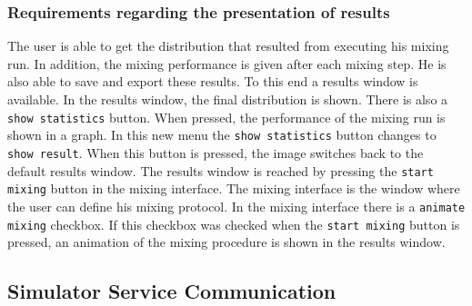 \subsubsection{Requirements regarding the presentation of results}
The user is able to get the distribution that resulted from executing his mixing run. In addition, the mixing performance is given after each mixing step. He is also able to save and export these results. To this end a results window is available. In the results window, the final distribution is shown. There is also a \texttt{show statistics} button. When pressed, the performance of the mixing run is shown in a graph. In this new menu the \texttt{show statistics} button changes to \texttt{show result}. When this button is pressed, the image switches back to the default results window. The results window is reached by pressing the \texttt{start mixing} button in the mixing interface. The mixing interface is the window where the user can define his mixing protocol. In the mixing interface there is a \texttt{animate mixing} checkbox. If this checkbox was checked when the \texttt{start mixing} button is pressed, an animation of the mixing procedure is shown in the results window.



\subsection{Simulator Service Communication}




